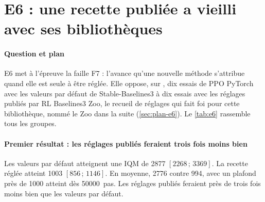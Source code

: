 \section{E6 : une recette publiée a vieilli avec ses bibliothèques}\label{sec:e6}

\paragraph{Question et plan}
E6 met à l'épreuve la faille F7 : l'avance qu'une nouvelle méthode s'attribue quand elle est seule à être
réglée. Elle oppose, sur , dix essais de PPO PyTorch avec les valeurs par défaut de
Stable-Baselines3 à dix essais avec les réglages publiés par RL Baselines3 Zoo, le recueil de réglages qui
fait foi pour cette bibliothèque, nommé le Zoo dans la suite (\cref{sec:plan-e6}). Le \cref{tab:e6} rassemble tous les groupes.


\paragraph{Premier résultat : les réglages publiés feraient trois fois moins bien}
Les valeurs par défaut atteignent une IQM de \num{2877} $[\num{2268}\,;\,\num{3369}]$. La recette réglée atteint
\num{1003} $[856\,;\,\num{1146}]$. En moyenne, \num{2776} contre 994, avec un plafond près de \num{1000} atteint
dès \num{50000}~pas. Les réglages publiés feraient près de trois fois moins bien que les valeurs par défaut.

